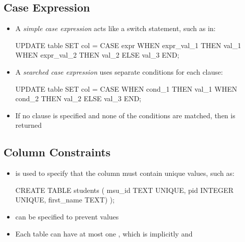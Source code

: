 \documentclass[a4paper]{article}
\begin{document}
\subsection{Case Expression}
\begin{itemize}
    \item A \emph{simple case expression} acts like a switch statement, such as in:
\begin{sql}
UPDATE table SET col =
CASE expr
  WHEN expr_val_1 THEN val_1
  WHEN expr_val_2 THEN val_2
  ELSE val_3
END;
\end{sql}
\item A \emph{searched case expression} uses separate conditions for each  clause:
\begin{sql}
UPDATE table SET col =
CASE
  WHEN cond_1 THEN val_1
  WHEN cond_2 THEN val_2
  ELSE val_3
END;
\end{sql}
\item If no  clause is specified and none of the conditions are matched, then  is returned
\end{itemize}

\subsection{Column Constraints}
\begin{itemize}
    \item {} is used to specify that the column must contain unique values, such as:
\begin{sql}
CREATE TABLE students (
    msu_id TEXT UNIQUE,
    pid INTEGER UNIQUE,
    first_name TEXT)
);
\end{sql}
    \item {} can be specified to prevent  values
    \item Each table can have at most one , which is implicitly  and 
\end{itemize}
\end{document}
